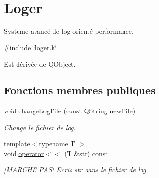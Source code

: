 \hypertarget{classLoger}{}\section{Loger}
\label{classLoger}


Système avancé de log orienté performance.  




{\ttfamily \#include \char`\"{}loger.\+h\char`\"{}}



Est dérivée de Q\+Object.

\subsection*{Fonctions membres publiques}
\begin{DoxyCompactItemize}
\item 
void \hyperlink{classLoger_a596151b92c56bbe8a487b81dcf3de698}{change\+Log\+File} (const Q\+String new\+File)
\begin{DoxyCompactList}\small\item\em Change le fichier de log. \end{DoxyCompactList}\item 
\mbox{\label{classLoger_addd00a92bac0233219c1e36ac0102f61}} 
{\footnotesize template$<$typename T $>$ }\\void \hyperlink{classLoger_addd00a92bac0233219c1e36ac0102f61}{operator$<$$<$} (T \&str) const
\begin{DoxyCompactList}\small\item\em \mbox{[}M\+A\+R\+C\+HE P\+AS\mbox{]} Ecris str dans le fichier de log \end{DoxyCompactList}\end{DoxyCompactItemize}
